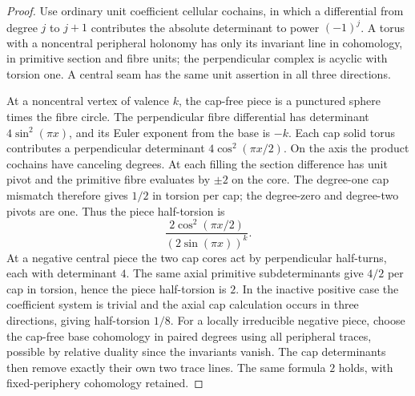 \begin{proof}
Use ordinary unit coefficient cellular cochains, in which a differential
from degree \(j\) to \(j+1\) contributes the absolute determinant to
power \((-1)^j\). A torus with a noncentral peripheral holonomy has only
its invariant line in cohomology, in primitive section and fibre units;
the perpendicular complex is acyclic with torsion one. A central seam
has the same unit assertion in all three directions.

At a noncentral vertex of valence \(k\), the cap-free piece is a
punctured sphere times the fibre circle. The perpendicular fibre
differential has determinant \(4\sin^2(\pi x)\), and its Euler exponent
from the base is \(-k\). Each cap solid torus contributes a
perpendicular determinant \(4\cos^2(\pi x/2)\). On the axis the product
cochains have canceling degrees. At each filling the section difference
has unit pivot and the primitive fibre evaluates by \(\pm2\) on the
core. The degree-one cap mismatch therefore gives \(1/2\) in torsion
per cap; the degree-zero and degree-two pivots are one. Thus the piece
half-torsion is
\[
                  \frac{2\cos^2(\pi x/2)}{(2\sin(\pi x))^k}.
\]
At a negative central piece the two cap cores act by perpendicular
half-turns, each with determinant \(4\). The same axial primitive
subdeterminants give \(4/2\) per cap in torsion, hence the piece
half-torsion is \(2\). In the inactive positive case the coefficient
system is trivial and the axial cap calculation occurs in three
directions, giving half-torsion \(1/8\).
For a locally irreducible negative piece, choose the cap-free base
cohomology in paired degrees using all peripheral traces, possible by
relative duality since the invariants vanish. The cap determinants
then remove exactly their own two trace lines. The same formula \(2\)
holds, with fixed-periphery cohomology retained.


\end{proof}
